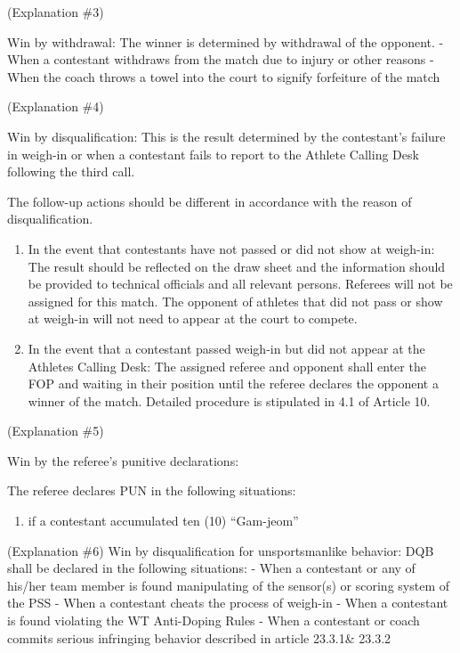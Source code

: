 \documentclass[
]{report}
\providecommand{\tightlist}{%
  \setlength{\itemsep}{0pt}\setlength{\parskip}{0pt}}
\renewcommand{\labelenumi}{\arabic{enumi}}
\begin{document}
(Explanation \#3)

Win by withdrawal: The winner is determined by withdrawal of the
opponent. - When a contestant withdraws from the match due to injury or
other reasons - When the coach throws a towel into the court to signify
forfeiture of the match

(Explanation \#4)

Win by disqualification: This is the result determined by the
contestant's failure in weigh-in or when a contestant fails to report to
the Athlete Calling Desk following the third call.

The follow-up actions should be different in accordance with the reason
of disqualification.

\begin{enumerate}
\def\labelenumi{\roman{enumi}.}
\item
  In the event that contestants have not passed or did not show at
  weigh-in: The result should be reflected on the draw sheet and the
  information should be provided to technical officials and all relevant
  persons. Referees will not be assigned for this match. The opponent of
  athletes that did not pass or show at weigh-in will not need to appear
  at the court to compete.
\item
  In the event that a contestant passed weigh-in but did not appear at
  the Athletes Calling Desk: The assigned referee and opponent shall
  enter the FOP and waiting in their position until the referee declares
  the opponent a winner of the match. Detailed procedure is stipulated
  in 4.1 of Article 10.
\end{enumerate}

(Explanation \#5)

Win by the referee's punitive declarations:

The referee declares PUN in the following situations:

\begin{enumerate}
\def\labelenumi{\roman{enumi}.}
\tightlist
\item
  if a contestant accumulated ten (10) ``Gam-jeom''
\end{enumerate}

(Explanation \#6) Win by disqualification for unsportsmanlike behavior:
DQB shall be declared in the following situations: - When a contestant
or any of his/her team member is found manipulating of the sensor(s) or
scoring system of the PSS - When a contestant cheats the process of
weigh-in - When a contestant is found violating the WT Anti-Doping Rules
- When a contestant or coach commits serious infringing behavior
described in article 23.3.1\& 23.3.2
\end{document}
